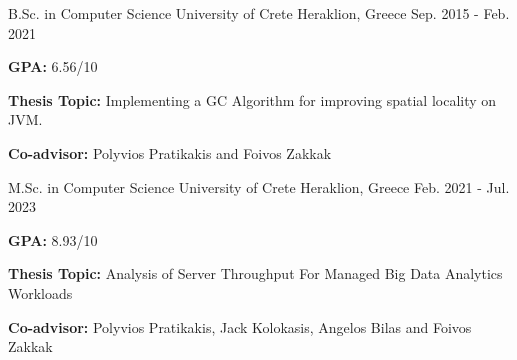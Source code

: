 
\begin{cventries}

  \cventry
    {B.Sc. in Computer Science} %
    {University of Crete} %
    {Heraklion, Greece} %
    {Sep. 2015 - Feb. 2021} %
    {
      \begin{cvitems} %
      	\item{\textbf{GPA:} 6.56/10}
      	\item{\textbf{Thesis Topic:} Implementing a GC Algorithm for improving spatial locality on JVM.}
      	\item{\textbf{Co-advisor:} Polyvios Pratikakis and Foivos Zakkak}
      \end{cvitems}
    }


  \cventry
    {M.Sc. in Computer Science} %
    {University of Crete} %
    {Heraklion, Greece} %
    {Feb. 2021 -  Jul. 2023} %
    {
      \begin{cvitems} %
        \item{\textbf{GPA:} 8.93/10}
        \item{\textbf{Thesis Topic:} Analysis of Server Throughput For Managed Big Data Analytics Workloads}
        \item{\textbf{Co-advisor:} Polyvios Pratikakis, Jack Kolokasis, Angelos Bilas and Foivos Zakkak}
      \end{cvitems}
    }
\end{cventries}
